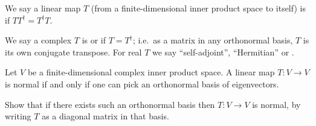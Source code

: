 \begin{definition}
	\label{def:hermitian}
	We say a linear map $T$
	(from a finite-dimensional inner product space to itself)
	is  if $TT^\dagger = T^\dagger T$.

	We say a complex $T$ is  or  if $T = T^\dagger$;
	i.e.\ as a matrix in any orthonormal basis, $T$ is its own conjugate transpose.
	For real $T$ we say ``self-adjoint'', ``Hermitian'' or .
\end{definition}
\begin{theorem}
	Let $V$ be a finite-dimensional complex inner product space.
	A linear map $T \colon V \to V$ is normal
	if and only if one can pick an orthonormal basis of eigenvectors.
\end{theorem}
\begin{exercise}
	Show that if there exists such an orthonormal basis
	then $T \colon V \to V$ is normal,
	by writing $T$ as a diagonal matrix in that basis.
\end{exercise}
